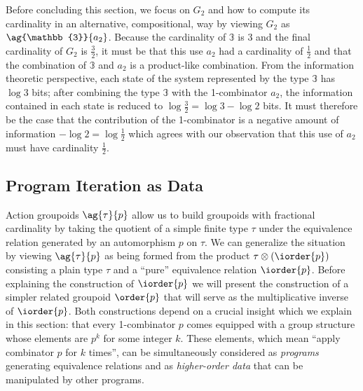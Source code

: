 
Before concluding this section, we focus on $G_2$ and how to compute
its cardinality in an alternative, compositional, way by viewing $G_2$
as $\ag{\mathbb{3}}{a_2}$.  Because the cardinality of $\mathbb{3}$ is
3 and the final cardinality of $G_2$ is $\frac{3}{2}$, it must be that
this use $a_2$ had a cardinality of $\frac{1}{2}$ and that the
combination of $\mathbb{3}$ and $a_2$ is a product-like
combination. From the information theoretic perspective, each state of
the system represented by the type $\mathbb{3}$ has $\log 3$ bits;
after combining the type $\mathbb{3}$ with the 1-combinator $a_2$, the
information contained in each state is reduced to
$\log \frac{3}{2} = \log 3 - \log 2$ bits. It must therefore be the
case that the contribution of the 1-combinator is a negative amount of
information $- \log 2 = \log \frac{1}{2}$ which agrees with our
observation that this use of $a_2$ must have cardinality
$\frac{1}{2}$.

\subsection{Program Iteration as Data}
   
Action groupoids $\ag{\tau}{p}$ allow us to build groupoids with
fractional cardinality by taking the quotient of a simple finite type
$\tau$ under the equivalence relation generated by an automorphism $p$
on $\tau$. We can generalize the situation by viewing $\ag{\tau}{p}$
as being formed from the product $\tau \otimes (\iorder{p})$ consisting a
plain type $\tau$ and a ``pure'' equivalence relation
$\iorder{p}$. Before explaining the construction of $\iorder{p}$ we
will present the construction of a simpler related groupoid
$\order{p}$ that will serve as the multiplicative inverse of
$\iorder{p}$. Both constructions depend on a crucial insight which we
explain in this section: that every 1-combinator $p$ comes equipped
with a group structure whose elements are $p^k$ for some integer
$k$. These elements, which mean ``apply combinator $p$ for $k$
times'', can be simultaneously considered as \emph{programs}
generating equivalence relations and as \emph{higher-order data} that
can be manipulated by other programs.

